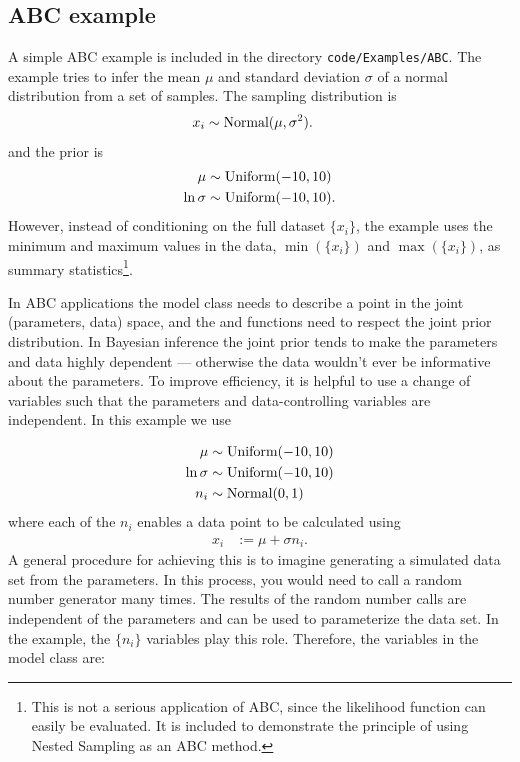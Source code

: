 \documentclass[article, nojss]{jss}
\begin{document}
\subsection{ABC example}
A simple ABC example is included in the directory
{\tt code/Examples/ABC}. The example tries to infer the mean
$\mu$ and standard deviation $\sigma$ of a normal distribution
from a set of samples. The sampling distribution is
\begin{align}
x_i &\sim \textnormal{Normal}(\mu, \sigma^2).
\end{align}
and the prior is
\begin{align}
\mu &\sim \textnormal{Uniform}(-10, 10)\\
\ln\sigma &\sim \textnormal{Uniform}(-10, 10).
\end{align}
However, instead of conditioning on the full dataset $\{x_i\}$, the example
uses the minimum and maximum values in the data,
$\min(\{x_i\})$ and $\max(\{x_i\})$, as summary statistics\footnote{This is
not a serious application of ABC, since the likelihood function can easily
be evaluated. It is included to demonstrate the principle of using
Nested Sampling as an ABC method.}.

In ABC applications the model class needs to describe a point in the joint
(parameters, data) space, and the  and 
functions need to respect the joint prior distribution.
In Bayesian inference the joint prior tends to make the
parameters and data highly dependent
--- otherwise the data wouldn't ever be informative about the parameters.
To improve efficiency, it is helpful to use a change of variables such that
the parameters and data-controlling variables are independent. In this
example we use

\begin{align}
\mu &\sim \textnormal{Uniform}(-10, 10)\\
\ln\sigma &\sim \textnormal{Uniform}(-10, 10)\\
n_i &\sim \textnormal{Normal}(0, 1)
\end{align}
where each of the $n_i$ enables a data point to be calculated using
\begin{align}
x_i &:= \mu + \sigma n_i.
\end{align}
A general procedure for achieving this is to imagine generating a
simulated data set from the parameters. In this process, you would need
to call a random number generator many times.
The results of the random number calls
are independent of the parameters and
can be used to parameterize the data set. In the example,
the $\{n_i\}$ variables play this role.
Therefore, the variables in the model class are:
\begin{CodeChunk}
\begin{CodeInput}
class MyModel
{
    private:
        double mu, log_sigma;
        std::vector<double> n;
\end{CodeInput}
\end{CodeChunk}
\end{document}
